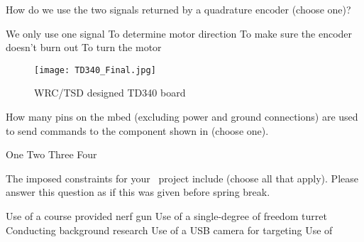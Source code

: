 \documentclass[addpoints,noanswers]{exam}
\begin{document}
\begin{questions}
\question[1]
How do we use the two signals returned by a quadrature encoder (choose one)?
\begin{choices}
\choice We only use one signal
\CorrectChoice To determine motor direction
\choice To make sure the encoder doesn't burn out
\choice To turn the motor
\end{choices}


\clearpage
\begin{figure}[h]
\begin{center}
\texttt{[image: TD340\_Final.jpg]}
\end{center}
\caption{WRC/TSD designed TD340 board}
\label{fig:3}
\end{figure}

\question[1]
How many pins on the mbed (excluding power and ground connections) are used to send commands to the component shown in  (choose one).
\begin{choices}
\choice One
\CorrectChoice Two
\choice Three
\choice Four
\end{choices}

\question[1]
The imposed constraints for your \usnaCourseNumber\ project include (choose all that apply). Please answer this question as if this was given before spring break.
\begin{choices}
\CorrectChoice Use of a course provided nerf gun
\CorrectChoice Use of a single-degree of freedom turret
\choice Conducting background research
\CorrectChoice Use of a USB camera for targeting
\CorrectChoice Use of \Matlab
\end{choices}
\end{questions}
\end{document}
